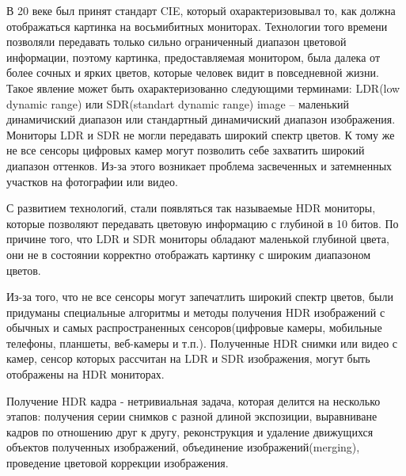 \Introduction

В 20 веке был принят стандарт CIE, который охарактеризовывал то, как должна отображаться картинка на восьмибитных мониторах. Технологии того времени позволяли передавать только сильно ограниченный диапазон цветовой информации, поэтому картинка, предоставляемая монитором, была далека от более сочных и ярких цветов, которые человек видит в повседневной жизни. Такое явление может быть охарактеризованно следующими терминами: LDR(low dynamic range) или SDR(standart dynamic range) image -- маленький динамичиский диапазон или стандартный динамичиский диапазон изображения. Мониторы LDR и SDR не могли передавать широкий спектр цветов. К тому же не все сенсоры цифровых камер могут позволить себе захватить широкий диапазон оттенков. Из-за этого возникает проблема засвеченных и затемненных участков на фотографии или видео.

С развитием технологий, стали появляться так называемые HDR мониторы, которые позволяют передавать цветовую информацию с глубиной в 10 битов. По причине того, что LDR и SDR мониторы обладают маленькой глубиной цвета, они не в состоянии корректно отображать картинку с широким диапазоном цветов.

Из-за того, что не все сенсоры могут запечатлить широкий спектр цветов, были придуманы специальные алгоритмы и методы получения HDR изображений с обычных и самых распространенных сенсоров(цифровые камеры, мобильные телефоны, планшеты, веб-камеры и т.п.). Полученные HDR снимки или видео с камер, сенсор которых рассчитан на LDR и SDR изображения, могут быть отображены на HDR мониторах.

Получение HDR кадра - нетривиальная задача, которая делится на несколько этапов: получения серии снимков с разной длиной экспозиции, выравниване кадров по отношению друг к другу, реконструкция и удаление движущихся объектов полученных изображений, объединение изображений(merging), проведение цветовой коррекции изображения.
